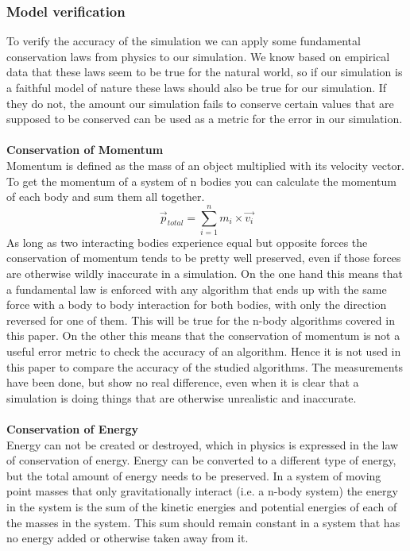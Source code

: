 \documentclass[11pt]{article} %
\begin{document}
\subsubsection{Model verification}
\label{verification}
To verify the accuracy of the simulation we can apply some fundamental conservation laws from physics to our simulation. We know based on empirical data that these laws seem to be true for the natural world, so if our simulation is a faithful model of nature these laws should also be true for our simulation. If they do not, the amount our simulation fails to conserve certain values that are supposed to be conserved can be used as a metric for the error in our simulation.\\\\
\textbf{Conservation of Momentum}\\
Momentum is defined as the mass of an object multiplied with its velocity vector. To get the momentum of a system of n bodies you can calculate the momentum of each body and sum them all together.
\begin{equation}
    \vec{p}_{total} = \sum_{i=1}^n m_i \times \vec{v_i}
\end{equation}
As long as two interacting bodies experience equal but opposite forces the conservation of momentum tends to be pretty well preserved, even if those forces are otherwise wildly inaccurate in a simulation. On the one hand this means that a fundamental law is enforced with any algorithm that ends up with the same force with a body to body interaction for both bodies, with only the direction reversed for one of them. This will be true for the n-body algorithms covered in this paper. On the other this means that the conservation of momentum is not a useful error metric to check the accuracy of an algorithm. Hence it is not used in this paper to compare the accuracy of the studied algorithms. The measurements have been done, but show no real difference, even when it is clear that a simulation is doing things that are otherwise unrealistic and inaccurate.\\\\
\textbf{Conservation of Energy}\\
Energy can not be created or destroyed, which in physics is expressed in the law of conservation of energy. Energy can be converted to a different type of energy, but the total amount of energy needs to be preserved. In a system of moving point masses that only gravitationally interact (i.e. a n-body system) the energy in the system is the sum of the kinetic energies and potential energies of each of the masses in the system. This sum should remain constant in a system that has no energy added or otherwise taken away from it. \\\\
\end{document}
